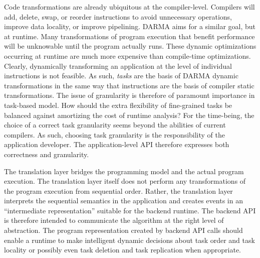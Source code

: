 Code transformations are already ubiquitous at the compiler-level.
Compilers will add, delete, swap, or reorder instructions to avoid unnecessary operations, improve data locality, or improve pipelining.
DARMA aims for a similar goal, but at runtime.
Many transformations of program execution that benefit performance will be unknowable until the program actually runs.
These dynamic optimizations occurring at runtime are much more expensive than compile-time optimizations.
Clearly, dynamically transforming an application at the level of individual instructions is not feasible.
As such, \emph{tasks} are the basis of DARMA dynamic transformations in the same way that instructions are the basis of compiler static transformations.
The issue of granularity is therefore of paramount importance in task-based model.
How should the extra flexibility of fine-grained tasks be balanced against amortizing the cost of runtime analysis?
For the time-being, the choice of a correct task granularity seems beyond the abilities of current compilers.
As such, choosing task granularity is the responsibility of the application developer.
The application-level API therefore expresses both correctness and granularity.

The translation layer bridges the programming model and the actual program execution.
The translation layer itself does not perform any transformations of the program execution from sequential order.
Rather, the translation layer interprets the sequential semantics in the application and creates events in an ``intermediate representation'' suitable for the backend runtime.
The backend API is therefore intended to communicate the algorithm at the right level of abstraction.
The program representation created by backend API calls should enable a runtime to make intelligent dynamic decisions about task order and task locality or possibly even task deletion and task replication when appropriate.


